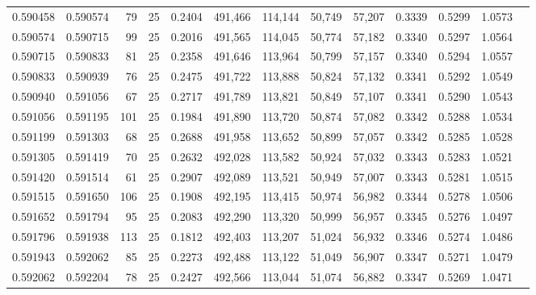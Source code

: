 \begin{tabular}{rrrrrrrrrrrrr}
0.590458 & 0.590574 &    79 &  25 &                                     0.2404 & 491,466 & 114,144 &  50,749 &  57,207 & 0.3339 & 0.5299 & 1.0573 \\
0.590574 & 0.590715 &    99 &  25 &                                     0.2016 & 491,565 & 114,045 &  50,774 &  57,182 & 0.3340 & 0.5297 & 1.0564 \\
0.590715 & 0.590833 &    81 &  25 &                                     0.2358 & 491,646 & 113,964 &  50,799 &  57,157 & 0.3340 & 0.5294 & 1.0557 \\
0.590833 & 0.590939 &    76 &  25 &                                     0.2475 & 491,722 & 113,888 &  50,824 &  57,132 & 0.3341 & 0.5292 & 1.0549 \\
0.590940 & 0.591056 &    67 &  25 &                                     0.2717 & 491,789 & 113,821 &  50,849 &  57,107 & 0.3341 & 0.5290 & 1.0543 \\
0.591056 & 0.591195 &   101 &  25 &                                     0.1984 & 491,890 & 113,720 &  50,874 &  57,082 & 0.3342 & 0.5288 & 1.0534 \\
0.591199 & 0.591303 &    68 &  25 &                                     0.2688 & 491,958 & 113,652 &  50,899 &  57,057 & 0.3342 & 0.5285 & 1.0528 \\
0.591305 & 0.591419 &    70 &  25 &                                     0.2632 & 492,028 & 113,582 &  50,924 &  57,032 & 0.3343 & 0.5283 & 1.0521 \\
0.591420 & 0.591514 &    61 &  25 &                                     0.2907 & 492,089 & 113,521 &  50,949 &  57,007 & 0.3343 & 0.5281 & 1.0515 \\
0.591515 & 0.591650 &   106 &  25 &                                     0.1908 & 492,195 & 113,415 &  50,974 &  56,982 & 0.3344 & 0.5278 & 1.0506 \\
0.591652 & 0.591794 &    95 &  25 &                                     0.2083 & 492,290 & 113,320 &  50,999 &  56,957 & 0.3345 & 0.5276 & 1.0497 \\
0.591796 & 0.591938 &   113 &  25 &                                     0.1812 & 492,403 & 113,207 &  51,024 &  56,932 & 0.3346 & 0.5274 & 1.0486 \\
0.591943 & 0.592062 &    85 &  25 &                                     0.2273 & 492,488 & 113,122 &  51,049 &  56,907 & 0.3347 & 0.5271 & 1.0479 \\
0.592062 & 0.592204 &    78 &  25 &                                     0.2427 & 492,566 & 113,044 &  51,074 &  56,882 & 0.3347 & 0.5269 & 1.0471 \\

\end{tabular}
